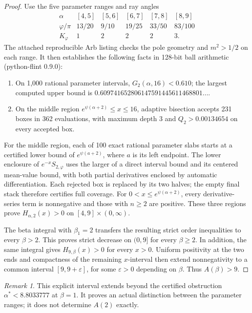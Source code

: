 \documentclass[11pt,a4paper]{article}
\theoremstyle{plain}
\theoremstyle{remark}
\newtheorem*{remark}{Remark}
\begin{document}
\begin{proof}
Use the five parameter ranges and ray angles
\[
\begin{array}{c|ccccc}
\alpha&[4,5]&[5,6]&[6,7]&[7,8]&[8,9]\\
\varphi/\pi&13/20&9/10&19/25&33/50&83/100\\
K_\varphi&1&2&2&2&3.
\end{array}
\]
The attached reproducible Arb listing checks the pole geometry and
$m^2>1/2$ on each range. It then establishes the following facts in
128-bit ball arithmetic (python-flint 0.9.0):
\begin{enumerate}
\item On 1,000 rational parameter intervals,
$G_2(\alpha,16)<0.610$; the largest computed upper bound is
$0.609741652806147591445611468801\ldots$.
\item On the middle region
$e^{\psi(\alpha+2)}\leq x\leq16$, adaptive bisection accepts
231 boxes in 362 evaluations, with maximum depth 3 and
$Q_2>0.00134654$ on every accepted box.
\end{enumerate}
For the middle region, each of 100 exact rational parameter slabs
starts at a certified lower bound of $e^{\psi(a+2)}$, where $a$ is
its left endpoint. The lower enclosure of $e^{-x}S_{2,\varphi}$
uses the larger of a direct interval bound and its centered
mean-value bound, with both partial derivatives enclosed by automatic
differentiation. Each rejected box is replaced by its two halves;
the empty final stack therefore certifies full coverage.
For $0<x\leq e^{\psi(\alpha+2)}$, every derivative-series term
is nonnegative and those with $n\geq2$ are positive.
These three regions prove $H_{\alpha,2}(x)>0$ on $[4,9]\times(0,\infty)$.

The beta integral with $\beta_1=2$ transfers the resulting strict
order inequalities to every $\beta>2$. This proves strict decrease
on $(0,9]$ for every $\beta\geq2$. In addition, the same integral
gives $H_{9,\beta}(x)>0$ for every $x>0$. Uniform positivity at the
two ends and compactness of the remaining $x$-interval then extend
nonnegativity to a common interval $[9,9+\varepsilon]$, for some
$\varepsilon>0$ depending on $\beta$. Thus $A(\beta)>9$.
\end{proof}

\begin{remark}
This explicit interval extends beyond the certified obstruction
$\alpha^*<8.8033777$ at $\beta=1$. It proves an actual distinction
between the parameter ranges; it does not determine $A(2)$ exactly.
\end{remark}
\end{document}
